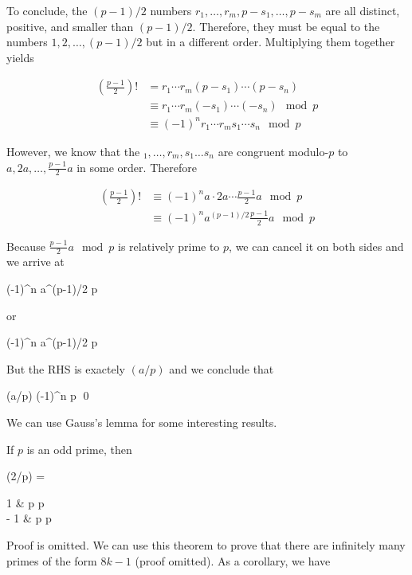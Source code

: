To conclude, the $(p-1)/2$ numbers $r_1, \ldots, r_m, p - s_1, \ldots, p - s_m$ are all distinct, positive, and smaller than $(p-1)/2$. Therefore, they must be equal to the numbers $1, 2, \ldots, (p-1)/2$ but in a different order. Multiplying them together yields

\begin{align*}
\left( \frac{p-1}{2} \right) ! &= r_1 \cdots r_m (p-s_1)\cdots (p-s_n) \\
&\equiv r_1 \cdots r_m (-s_1)\cdots (-s_n) \mod p \\
&\equiv(-1)^n r_1 \cdots r_m s_1\cdots s_n \mod p
\end{align*}

However, we know that the $_1, \ldots, r_m, s_1\ldots s_n$ are congruent modulo-$p$ to $a, 2a, \ldots, \frac{p-1}{2}a$  in some order. Therefore 

\begin{align*}
\left( \frac{p-1}{2} \right) ! &\equiv (-1)^n a \cdot 2a \cdots \frac{p-1}{2}a \mod p \\
&\equiv (-1)^n a^{(p-1)/2} \frac{p-1}{2}a \mod p
\end{align*}

Because $\frac{p-1}{2}a \mod p$ is relatively prime to $p$, we can cancel it on both sides and we arrive at

 \equiv (-1)^n a^{(p-1)/2}  \mod p \\
\eee

or

\bee
(-1)^n  \equiv a^{(p-1)/2}  \mod p \\
\eee

But the RHS is exactely $(a/p)$ and we conclude that

\bee
(a/p) \equiv (-1)^n \mod p \qed
\eee

We can use Gauss's lemma for some interesting results.

\begin{theorem}\label{2023-02-13:th5}
	If $p$ is an odd prime, then

	\bee
		(2/p) = \begin{cases}
			1 &  p    p   \\
			- 1 &  p    p  
		\end{cases}
	\eee
\end{theorem}

Proof is omitted. We can use this theorem to prove that there are infinitely many primes of the form $8k-1$ (proof omitted). As a corollary, we have

